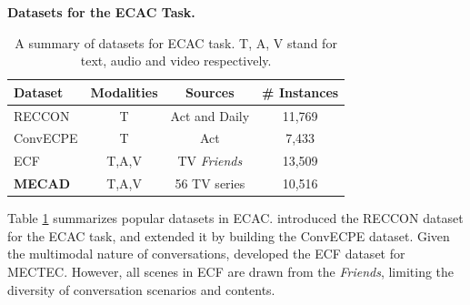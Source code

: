 \documentclass[11pt]{article}
\begin{document}
\noindent\textbf{Datasets for the ECAC Task.}
\begin{table}
  \small
  \caption{A summary of datasets for ECAC task. T, A, V stand for text, audio and video respectively.}
  \label{tab:related-dataset}
  \centering
  \begin{tabular}{l|c|c|c}
    \toprule
    Dataset & Modalities & Sources &  \# Instances\\
    \midrule
    RECCON & T & Act and Daily  & 11,769 \\
    ConvECPE & T & Act  & 7,433 \\
    \midrule
    ECF & T,A,V & TV \textit{Friends}  & 13,509 \\
    \textbf{MECAD} & T,A,V & 56 TV series &  10,516 \\
  \bottomrule
  \end{tabular}
  \vspace{-4mm}
\end{table}
Table \ref{tab:related-dataset} summarizes popular datasets in ECAC.
\citet{RECCON} introduced the RECCON dataset for the ECAC task, and \citet{li2022ecpec} extended it by building the ConvECPE dataset.
Given the multimodal nature of conversations, \citet{ecf} developed the ECF dataset for MECTEC.
However, all scenes in ECF are drawn from the \textit{Friends}, limiting the diversity of conversation scenarios and contents.
\end{document}
